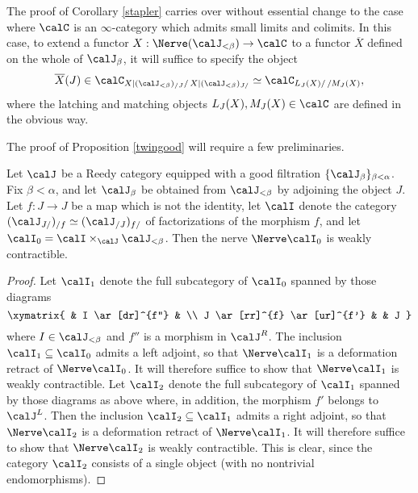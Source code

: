 \begin{Model Categories}
\begin{Didn't Read}
\begin{remark}\label{stapler2}
The proof of Corollary \ref{stapler} carries over without essential change to the case where
$\calC$ is an $\infty$-category which admits small limits and colimits. In this case, to
extend a functor $X: \Nerve( \calJ_{< \beta}) \rightarrow \calC$ to a functor $\overline{X}$ defined on the whole of $\calJ_{\beta}$, it will suffice to specify the object
$$ \overline{X}(J) \in \calC_{ X | (\calJ_{< \beta})_{/J} / \, X | (\calJ_{< \beta})_{J/}}
\simeq \calC_{ L_{J}(X) / \, / M_J(X) },$$
where the latching and matching objects $L_J(X), M_J(X) \in \calC$ are defined in the obvious way.
\end{remark}

The proof of Proposition \ref{twingood} will require a few preliminaries.

\begin{lemma}\label{gump1}
Let $\calJ$ be a Reedy category equipped with a good filtration
$\{ \calJ_{\beta} \}_{\beta < \alpha}$. Fix $\beta < \alpha$, and let
$\calJ_{\beta}$ be obtained from $\calJ_{< \beta}$ by adjoining the object $J$.
Let $f: J \rightarrow J$ be a map which is not the identity, let
$\calI$ denote the category $(\calJ_{J/})_{/f} \simeq (\calJ_{/J})_{f/}$ of
factorizations of the morphism $f$, and let $\calI_0 = \calI \times_{\calJ} \calJ_{< \beta}$. Then
the nerve $\Nerve \calI_0$ is weakly contractible.
\end{lemma}

\begin{proof}
Let $\calI_1$ denote the full subcategory of $\calI_0$ spanned by those diagrams
$$ \xymatrix{ & I \ar[dr]^{f''} & \\
J \ar[rr]^{f} \ar[ur]^{f'} & & J }$$
where $I \in \calJ_{< \beta}$ and $f''$ is a morphism in $\calJ^{R}$. The inclusion
$\calI_1 \subseteq \calI_0$ admits a left adjoint, so that $\Nerve \calI_1$ is a deformation retract
of $\Nerve \calI_0$. It will therefore suffice to show that $\Nerve \calI_1$ is weakly contractible.
Let $\calI_2$ denote the full subcategory of $\calI_1$ spanned by those diagrams as above
where, in addition, the morphism $f'$ belongs to $\calJ^{L}$. Then the inclusion
$\calI_2 \subseteq \calI_1$ admits a right adjoint, so that $\Nerve \calI_2$ is a deformation retract of $\Nerve \calI_1$. It will therefore suffice to show that $\Nerve \calI_2$ is weakly contractible. This is clear, since the category $\calI_2$ consists of a single object (with no nontrivial endomorphisms).
\end{proof}


\end{Didn't Read}
\end{Model Categories}

